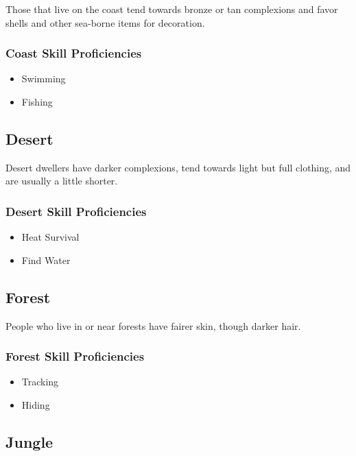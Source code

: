 \begin{multicols}{2}
Those that live on the coast tend towards bronze or tan complexions
and favor shells and other sea-borne items for decoration.

\subsubsection{Coast Skill Proficiencies}

\begin{itemize}
  \item Swimming
  \item Fishing
\end{itemize}

\subsection{Desert}

Desert dwellers have darker complexions, tend towards light but full
clothing, and are usually a little shorter.

\subsubsection{Desert Skill Proficiencies}

\begin{itemize}
  \item Heat Survival
  \item Find Water
\end{itemize}

\subsection{Forest}

People who live in or near forests have fairer skin, though darker
hair.

\subsubsection{Forest Skill Proficiencies}

\begin{itemize}
  \item Tracking
  \item Hiding
\end{itemize}

\subsection{Jungle}


\end{multicols}
